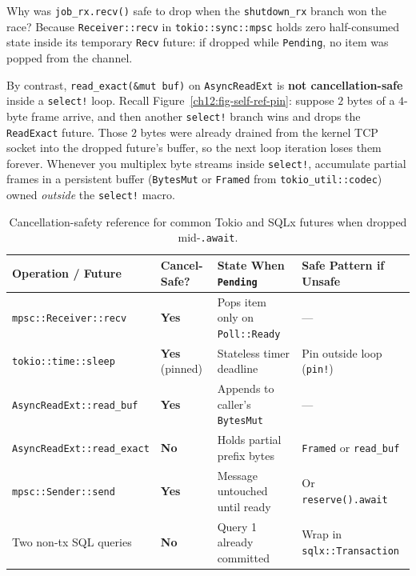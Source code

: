 Why was \texttt{job\_rx.recv()} safe to drop when the \texttt{shutdown\_rx} branch won the race? Because \texttt{Receiver::recv} in \texttt{tokio::sync::mpsc} holds zero half-consumed state inside its temporary \texttt{Recv} future: if dropped while \texttt{Pending}, no item was popped from the channel.

By contrast, \texttt{read\_exact(\&mut buf)} on \texttt{AsyncReadExt} is \textbf{not cancellation-safe} inside a \texttt{select!} loop. Recall Figure~\ref{ch12:fig-self-ref-pin}: suppose $2$ bytes of a $4$-byte frame arrive, and then another \texttt{select!} branch wins and drops the \texttt{ReadExact} future. Those $2$ bytes were already drained from the kernel TCP socket into the dropped future's buffer, so the next loop iteration loses them forever. Whenever you multiplex byte streams inside \texttt{select!}, accumulate partial frames in a persistent buffer (\texttt{BytesMut} or \texttt{Framed} from \texttt{tokio\_util::codec}) owned \emph{outside} the \texttt{select!} macro.

\begin{table}[H]
\centering
\footnotesize
\begin{tabular}{@{}p{4.0cm}p{2.2cm}p{4.5cm}p{3.9cm}@{}}
\toprule
\textbf{Operation / Future} & \textbf{Cancel-Safe?} & \textbf{State When \texttt{Pending}} & \textbf{Safe Pattern if Unsafe} \\
\midrule
\texttt{mpsc::Receiver::recv} & \textbf{Yes} & Pops item only on \texttt{Poll::Ready} & --- \\
\texttt{tokio::time::sleep} & \textbf{Yes} (pinned) & Stateless timer deadline & Pin outside loop (\texttt{pin!}) \\
\texttt{AsyncReadExt::read\_buf} & \textbf{Yes} & Appends to caller's \texttt{BytesMut} & --- \\
\texttt{AsyncReadExt::read\_exact} & \textbf{No} & Holds partial prefix bytes & \texttt{Framed} or \texttt{read\_buf} \\
\texttt{mpsc::Sender::send} & \textbf{Yes} & Message untouched until ready & Or \texttt{reserve().await} \\
Two non-tx SQL queries & \textbf{No} & Query 1 already committed & Wrap in \texttt{sqlx::Transaction} \\
\bottomrule
\end{tabular}
\caption{Cancellation-safety reference for common Tokio and SQLx futures when dropped mid-\texttt{.await}.}
\label{ch12:tab-cancel-safety}
\end{table}

